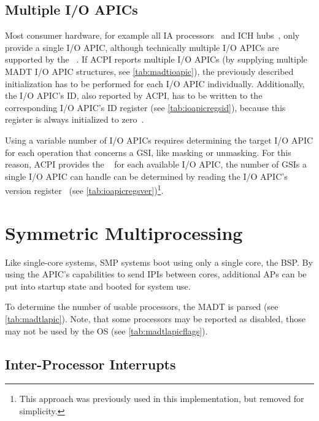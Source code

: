 \subsection{Multiple I/O APICs}
\label{subsec:multiioapic}

Most consumer hardware, for example all IA processors~\autocite{ia32} and ICH hubs~\autocite{ich5}, only provide a single I/O APIC, although technically multiple I/O APICs are supported by the ~\autocite[sec.~3.6.8]{mpspec}.
If ACPI reports multiple I/O APICs (by supplying multiple MADT I/O APIC structures, see \autoref{tab:madtioapic}), the previously described initialization has to be performed for each I/O APIC individually.
Additionally, the I/O APIC's ID, also reported by ACPI, has to be written to the corresponding I/O APIC's ID register (see \autoref{tab:ioapicregsid}), because this register is always initialized to zero~\autocite[sec.~9.5.6]{ich5}.

Using a variable number of I/O APICs requires determining the target I/O APIC for each operation that concerns a GSI, like masking or unmasking.
For this reason, ACPI provides the ~\autocite[sec.~5.2.8.2]{acpi1} for each available I/O APIC, the number of GSIs a single I/O APIC can handle can be determined by reading the I/O APIC's version register~\autocite[sec.~9.5.7]{ich5} (see \autoref{tab:ioapicregsver})\footnote{
  This approach was previously used in this implementation, but removed for simplicity.}.

\clearpage

\section{Symmetric Multiprocessing}
\label{sec:smpinit}

Like single-core systems, SMP systems boot using only a single core, the BSP\@.
By using the APIC's capabilities to send IPIs between cores, additional APs can be put into startup state and booted for system use.

To determine the number of usable processors, the MADT is parsed (see \autoref{tab:madtlapic}).
Note, that some processors may be reported as disabled, those may not be used by the OS (see \autoref{tab:madtlapicflags}).

\subsection{Inter-Processor Interrupts}
\label{subsec:ipis}

